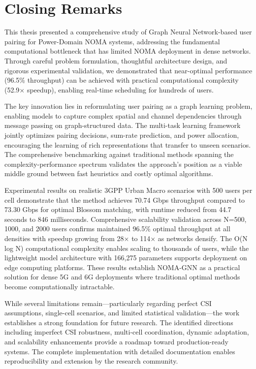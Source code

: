 \section{Closing Remarks}

This thesis presented a comprehensive study of Graph Neural Network-based user pairing for Power-Domain NOMA systems, addressing the fundamental computational bottleneck that has limited NOMA deployment in dense networks. Through careful problem formulation, thoughtful architecture design, and rigorous experimental validation, we demonstrated that near-optimal performance (96.5\% throughput) can be achieved with practical computational complexity (52.9× speedup), enabling real-time scheduling for hundreds of users.

The key innovation lies in reformulating user pairing as a graph learning problem, enabling models to capture complex spatial and channel dependencies through message passing on graph-structured data. The multi-task learning framework jointly optimizes pairing decisions, sum-rate prediction, and power allocation, encouraging the learning of rich representations that transfer to unseen scenarios. The comprehensive benchmarking against traditional methods spanning the complexity-performance spectrum validates the approach's position as a viable middle ground between fast heuristics and costly optimal algorithms.

Experimental results on realistic 3GPP Urban Macro scenarios with 500 users per cell demonstrate that the method achieves 70.74 Gbps throughput compared to 73.30 Gbps for optimal Blossom matching, with runtime reduced from 44.7 seconds to 846 milliseconds. Comprehensive scalability validation across N=500, 1000, and 2000 users confirms maintained 96.5\% optimal throughput at all densities with speedup growing from 28× to 114× as networks densify. The O(N log N) computational complexity enables scaling to thousands of users, while the lightweight model architecture with 166,275 parameters supports deployment on edge computing platforms. These results establish NOMA-GNN as a practical solution for dense 5G and 6G deployments where traditional optimal methods become computationally intractable.

While several limitations remain—particularly regarding perfect CSI assumptions, single-cell scenarios, and limited statistical validation—the work establishes a strong foundation for future research. The identified directions including imperfect CSI robustness, multi-cell coordination, dynamic adaptation, and scalability enhancements provide a roadmap toward production-ready systems. The complete implementation with detailed documentation enables reproducibility and extension by the research community.

